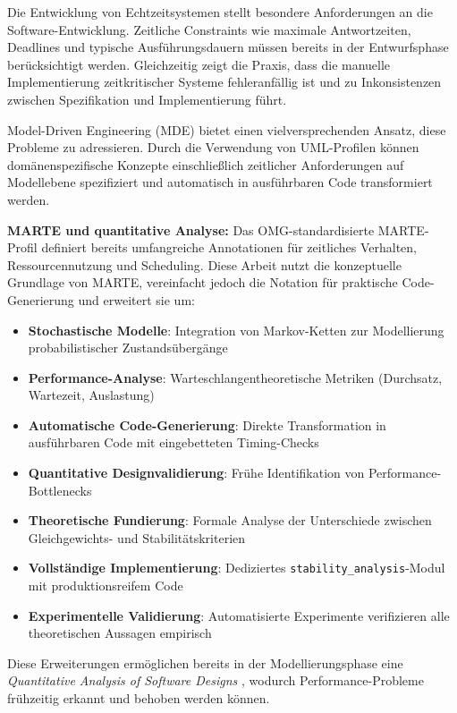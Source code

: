 ﻿\documentclass[a4paper,12pt]{report}
\theoremstyle{definition}
\begin{document}
Die Entwicklung von Echtzeitsystemen stellt besondere Anforderungen an die Software-Entwicklung. Zeitliche Constraints wie maximale Antwortzeiten, Deadlines und typische Ausführungsdauern müssen bereits in der Entwurfsphase berücksichtigt werden. Gleichzeitig zeigt die Praxis, dass die manuelle Implementierung zeitkritischer Systeme fehleranfällig ist und zu Inkonsistenzen zwischen Spezifikation und Implementierung führt.

Model-Driven Engineering (MDE) bietet einen vielversprechenden Ansatz, diese Probleme zu adressieren. Durch die Verwendung von UML-Profilen können domänenspezifische Konzepte einschließlich zeitlicher Anforderungen auf Modellebene spezifiziert und automatisch in ausführbaren Code transformiert werden.

\textbf{MARTE und quantitative Analyse:} Das OMG-standardisierte MARTE-Profil \cite{marte} definiert bereits umfangreiche Annotationen für zeitliches Verhalten, Ressourcennutzung und Scheduling. Diese Arbeit nutzt die konzeptuelle Grundlage von MARTE, vereinfacht jedoch die Notation für praktische Code-Generierung und erweitert sie um:

\begin{itemize}
	\item[-] \textbf{Stochastische Modelle}: Integration von Markov-Ketten
	zur Modellierung probabilistischer Zustandsübergänge
	\item[-] \textbf{Performance-Analyse}: Warteschlangentheoretische Metriken
	(Durchsatz, Wartezeit, Auslastung)
	\item[-] \textbf{Automatische Code-Generierung}: Direkte Transformation in
	ausführbaren Code mit eingebetteten Timing-Checks
	\item[-] \textbf{Quantitative Designvalidierung}: Frühe Identifikation von
	Performance-Bottle\-necks
	\item[-] \textbf{Theoretische Fundierung}: Formale Analyse der Unterschiede
	zwischen Gleichge\-wichts- und Stabilitätskriterien
	\item[-] \textbf{Vollständige Implementierung}: Dediziertes
	\texttt{stability\_analysis}-Modul mit produktionsreifem Code
	\item[-] \textbf{Experimentelle Validierung}: Automatisierte Experimente
	verifizieren alle theoretischen Aussagen empirisch
\end{itemize}

Diese Erweiterungen ermöglichen bereits in der Modellierungsphase eine \textit{Quantitative Analysis of Software Designs} \cite{smith1990}, wodurch Performance-Probleme frühzeitig erkannt und behoben werden können.
\end{document}
